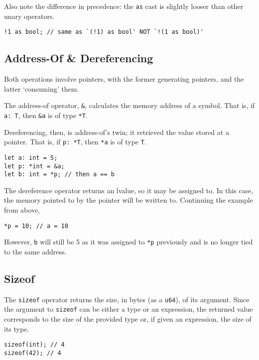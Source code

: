 Also note the difference in precedence: the \texttt{as} cast is slightly looser than other unary operators.

\begin{lstlisting}[language=CustomLang]
!1 as bool; // same as `(!1) as bool' NOT `!(1 as bool)'
\end{lstlisting}

\subsection{Address-Of \& Dereferencing}\label{subsec:address-of-&-dereferencing}

Both operations involve pointers, with the former generating pointers, and the latter `consuming' them.

The address-of operator, \texttt{\&}, calculates the memory address of a symbol.
That is, if \texttt{a: T}, then \texttt{\&a} is of type \texttt{*T}.

Dereferencing, then, is address-of's twin; it retrieved the value stored at a pointer.
That is, if \texttt{p: *T}, then \texttt{*a} is of type \texttt{T}.

\begin{lstlisting}[language=CustomLang]
let a: int = 5;
let p: *int = &a;
let b: int = *p; // then a == b
\end{lstlisting}

The dereference operator returns an lvalue, so it may be assigned to.
In this case, the memory pointed to by the pointer will be written to.
Continuing the example from above,

\begin{lstlisting}[language=CustomLang]
*p = 10; // a = 10
\end{lstlisting}

However, \texttt{b} will still be 5 as it was assigned to \texttt{*p} previously and is no longer tied to the same address.

\subsection{Sizeof}

The \texttt{sizeof} operator returns the size, in bytes (as a \texttt{u64}), of its argument.
Since the argument to \texttt{sizeof} can be either a type or an expression, the returned value corresponds to the size of the provided type or, if given an expression, the size of its type.

\begin{lstlisting}[language=CustomLang]
sizeof(int); // 4
sizeof(42); // 4
\end{lstlisting}

